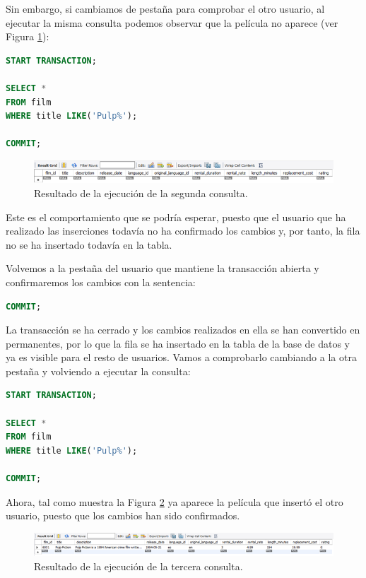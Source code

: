 \documentclass[a4paper]{article}
\begin{document}
Sin embargo, si cambiamos de pestaña para comprobar el otro usuario, al ejecutar la misma consulta podemos observar que la película no aparece (ver Figura \ref{fig:2consulta}):

\begin{lstlisting}[language=SQL]
START TRANSACTION;

SELECT * 
FROM film
WHERE title LIKE('Pulp%');

COMMIT;
\end{lstlisting}

\begin{figure}[ht]
    \centering
    \includegraphics[width=0.9\columnwidth]{figs/2consulta.png}
    \caption{Resultado de la ejecución de la segunda consulta.}\label{fig:2consulta}
\end{figure}

Este es el comportamiento que se podría esperar, puesto que el usuario que ha realizado las inserciones todavía no ha confirmado los cambios y, por tanto, la fila no se ha insertado todavía en la tabla.

Volvemos a la pestaña del usuario que mantiene la transacción abierta y confirmaremos los cambios con la sentencia:

\begin{lstlisting}[language=SQL]
COMMIT;
\end{lstlisting}

La transacción se ha cerrado y los cambios realizados en ella se han convertido en permanentes, por lo que la fila se ha insertado en la tabla de la base de datos y ya es visible para el resto de usuarios. Vamos a comprobarlo cambiando a la otra pestaña y volviendo a ejecutar la consulta:

\begin{lstlisting}[language=SQL]
START TRANSACTION;

SELECT * 
FROM film
WHERE title LIKE('Pulp%');

COMMIT;
\end{lstlisting}

Ahora, tal como muestra la Figura \ref{fig:3consulta} ya aparece la película que insertó el otro usuario, puesto que los cambios han sido confirmados.

\begin{figure}[ht]
    \centering
    \includegraphics[width=0.9\columnwidth]{figs/3consulta.png}
    \caption{Resultado de la ejecución de la tercera consulta.}\label{fig:3consulta}
\end{figure}
\end{document}
